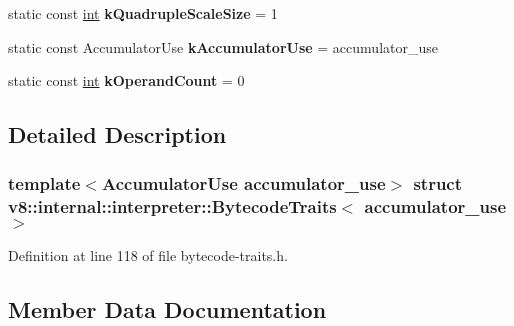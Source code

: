 \begin{DoxyCompactItemize}
\item 
\mbox{\label{structv8_1_1internal_1_1interpreter_1_1BytecodeTraits_3_01accumulator__use_01_4_af8b46864f991fb002875db33915d496b}} 
static const \mbox{\hyperlink{classint}{int}} {\bfseries k\+Quadruple\+Scale\+Size} = 1
\item 
\mbox{\label{structv8_1_1internal_1_1interpreter_1_1BytecodeTraits_3_01accumulator__use_01_4_a15975c35bcb7bfab7d9ebb5b0f4d30a5}} 
static const Accumulator\+Use {\bfseries k\+Accumulator\+Use} = accumulator\+\_\+use
\item 
\mbox{\label{structv8_1_1internal_1_1interpreter_1_1BytecodeTraits_3_01accumulator__use_01_4_ac8d74ac459c9a9b205b87cb003914a92}} 
static const \mbox{\hyperlink{classint}{int}} {\bfseries k\+Operand\+Count} = 0
\end{DoxyCompactItemize}


\subsection{Detailed Description}
\subsubsection*{template$<$Accumulator\+Use accumulator\+\_\+use$>$\newline
struct v8\+::internal\+::interpreter\+::\+Bytecode\+Traits$<$ accumulator\+\_\+use $>$}



Definition at line 118 of file bytecode-\/traits.\+h.



\subsection{Member Data Documentation}
\mbox{\label{structv8_1_1internal_1_1interpreter_1_1BytecodeTraits_3_01accumulator__use_01_4_a72a08f115d95f10659dbc458150329b4}} 
